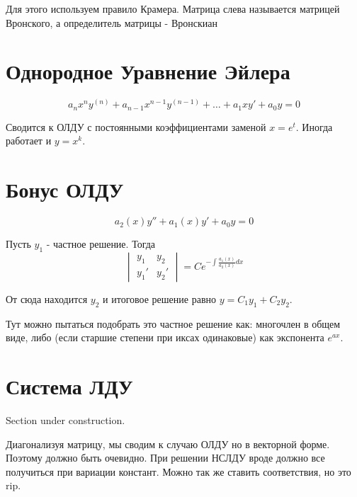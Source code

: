 \documentclass[11pt]{article}
\begin{document}
\begin{enumerate}
\begin{itemize}
				Для этого используем правило Крамера. Матрица слева называется матрицей Вронского, а определитель матрицы - Вронскиан
			\end{itemize}
		
	\end{enumerate}


	\section{Однородное Уравнение Эйлера}
	$$a_{n}x^n y^{(n)} +a_{n-1}x^{n-1} y^{(n-1)} + \dots + a_{1} xy' + a_{0} y = 0 $$
	
	Сводится к ОЛДУ с постоянными коэффициентами заменой $x = e^t$. Иногда работает и $y = x^k$.
	

	\section{Бонус ОЛДУ}
	
	$$a_2(x) y'' + a_1(x)y' + a_0 y = 0$$
	
	Пусть $y_1$ - частное решение. Тогда
	$$
	\begin{vmatrix}
	y_1 & y_2\\
	y_1' & y_2'
	\end{vmatrix} = C e^{-\int \frac{a_1(x)}{a_2(x)}dx }
	$$
	
	От сюда находится $y_2$ и итоговое решение равно $y = C_1 y_1 + C_2 y_2$. 
	
	Тут можно пытаться подобрать это частное решение как: многочлен в общем виде, либо (если старшие степени при иксах одинаковые) как экспонента $e^{ax}$.

	\section{Система ЛДУ}

Section under construction.
	
	Диагонализуя матрицу, мы сводим к случаю ОЛДУ но в векторной форме. Поэтому должно быть очевидно.
	При решении НСЛДУ вроде должно все получиться при вариации констант. Можно так же ставить соответствия, но это rip. \\
\end{document}

